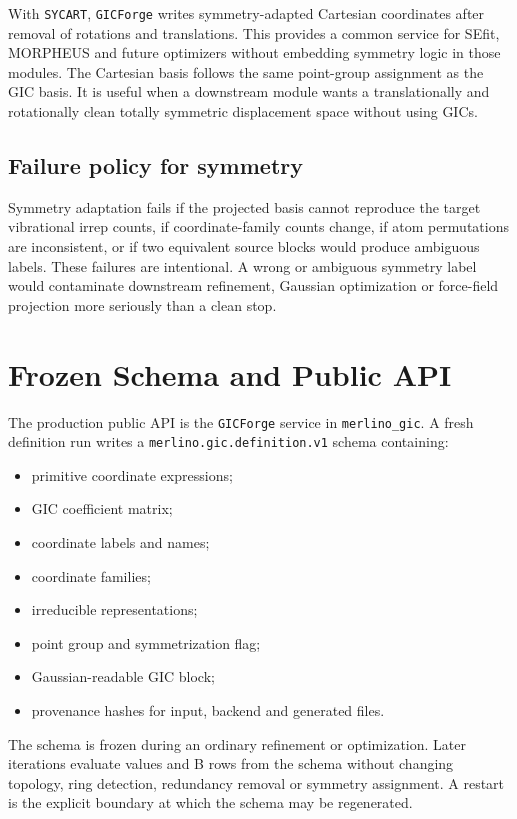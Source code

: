 \documentclass[11pt]{article}
\newcommand{\program}{\texttt{GICForge}}
\begin{document}
With \texttt{SYCART}, \program{} writes symmetry-adapted Cartesian coordinates
after removal of rotations and translations.  This provides a common service
for SEfit, MORPHEUS and future optimizers without embedding symmetry logic in
those modules.  The Cartesian basis follows the same point-group assignment as
the GIC basis.  It is useful when a downstream module wants a translationally
and rotationally clean totally symmetric displacement space without using GICs.

\subsection{Failure policy for symmetry}

Symmetry adaptation fails if the projected basis cannot reproduce the target
vibrational irrep counts, if coordinate-family counts change, if atom
permutations are inconsistent, or if two equivalent source blocks would produce
ambiguous labels.  These failures are intentional.  A wrong or ambiguous
symmetry label would contaminate downstream refinement, Gaussian optimization
or force-field projection more seriously than a clean stop.

\section{Frozen Schema and Public API}

The production public API is the \texttt{GICForge} service in
\texttt{merlino\_gic}.  A fresh definition run writes a
\texttt{merlino.gic.definition.v1} schema containing:

\begin{itemize}
  \item primitive coordinate expressions;
  \item GIC coefficient matrix;
  \item coordinate labels and names;
  \item coordinate families;
  \item irreducible representations;
  \item point group and symmetrization flag;
  \item Gaussian-readable GIC block;
  \item provenance hashes for input, backend and generated files.
\end{itemize}

\noindent
The schema is frozen during an ordinary refinement or optimization.  Later
iterations evaluate values and B rows from the schema without changing
topology, ring detection, redundancy removal or symmetry assignment.  A restart
is the explicit boundary at which the schema may be regenerated.
\end{document}
